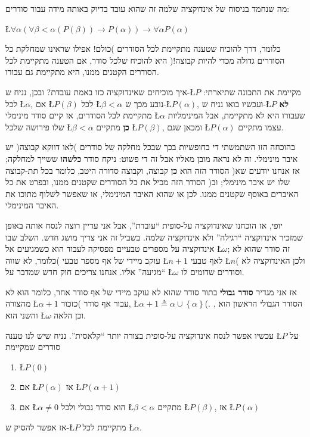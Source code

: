 \documentclass[english,hebrew]{article}
\begin{document}
מה שנחמד בניסוח של אינדוקציה שלמה זה שהוא עובד בדיוק באותה מידה עבור
סודרים:

\L{$\forall\alpha\left(\forall\beta<\alpha\left(P\left(\beta\right)\right)\to P\left(\alpha\right)\right)\to\forall\alpha P\left(\alpha\right)$}

כלומר, דרך להוכיח שטענה מתקיימת לכל הסודרים )כולם! אפילו שראינו שמחלקת
כל הסודרים גדולה מכדי להיות קבוצה!( היא להוכיח שלכל סודר, אם הטענה
מתקיימת לכל הסודרים הקטנים ממנו, היא מתקיימת גם עבורו.

איך מוכיחים שאינדוקציה כזו באמת עובדת? ובכן, נניח ש-\L{$P$} מקיימת
את התכונה שתיארתי: לכל \L{$\alpha$}, אם \L{$P\left(\beta\right)$}
לכל \L{$\beta<\alpha$} נובע מכך ש-\L{$P\left(\alpha\right)$}, ועכשיו
בואו נניח ש-\L{$P$} \textbf{לא} מתקיימת לכל הסודרים, אז קיים סודר
מינימלי \L{$\alpha$} שעבורו היא לא מתקיימת, אבל המינימליות שלו פירושה
שלכל \L{$\beta<\alpha$} \textbf{כן} מתקיים \L{$P\left(\beta\right)$},
ומכאן שגם \L{$P\left(\alpha\right)$} עצמו מתקיים.

בהוכחה הזו השתמשתי די בחופשיות בכך שבכל מחלקה של סודרים )לאו דווקא
קבוצה( יש איבר מינימלי. זה לא נראה מובן מאליו אבל זה די פשוט: ניקח
סודר \textbf{כלשהו} ששייך למחלקה; אז אנחנו יודעים שא( הסודר הזה הוא
\textbf{כן} קבוצה, וקבוצה סדורה היטב, כלומר בכל תת-קבוצה שלו יש איבר
מינימלי; וב( הסודר הזה מכיל את כל הסודרים שקטנים ממנו, ובפרט את כל
האיברים באוסף שקטנים ממנו. לכן או שהוא האיבר המינימלי, או שאפשר לשלוף
מתוכו את האיבר המינימלי.

יופי, אז הוכחנו שאינדוקציה על-סופית \textquotedblleft עובדת\textquotedblright ,
אבל אני עדיין רוצה לנסח אותה באופן שמזכיר אינדוקציה \textquotedblleft רגילה\textquotedblright{}
ולא אינדוקציה שלמה. בשביל זה אני צריך מושג חדש. השלב שבו אינדוקציה
על מספרים טבעיים מפסיקה לעבוד הוא כשמגיעים אל \L{$\omega$}; זה סודר
שהוא לא עוקב מיידי של אף מספר טבעי )כלומר, לא שווה \L{$n+1$} לאף
טבעי \L{$n$}( ולכן האינדוקציה לא \textquotedblleft מגיעה\textquotedblright{}
אליו. אנחנו צריכים חוק חדש שמדבר על \L{$\omega$} וסודרים שדומים לו.

אז אני מגדיר \textbf{סודר גבולי} בתור סודר שהוא לא עוקב מיידי של אף
סודר אחר, כלומר הוא לא מהצורה \L{$\alpha+1$} עבור אף סודר )כזכור,
\L{$\alpha+1\triangleq\alpha\cup\left\{ \alpha\right\} $}(. הסודר
הגבולי הראשון הוא {\endL}, והשני הוא \L{$\omega$} וכן הלאה.

עכשיו אפשר לנסח אינדוקציה על-סופית בצורה יותר \textquotedblleft קלאסית\textquotedblright .
נניח שיש לנו טענה \L{$P$} על סודרים שמקיימת
\begin{enumerate}
\item \L{$P\left(0\right)$}
\item אם \L{$P\left(\alpha\right)$} אז \L{$P\left(\alpha+1\right)$}
\item אם \L{$\alpha\ne0$} הוא סודר גבולי ולכל \L{$\beta<\alpha$} מתקיים
\L{$P\left(\beta\right)$}, אז \L{$P\left(\alpha\right)$}
\end{enumerate}
אז אפשר להסיק ש-\L{$P$} מתקיימת לכל \L{$\alpha$}.
\end{document}
